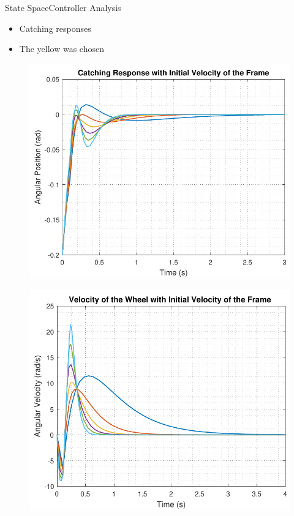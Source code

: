 \begin{frame}{State Space}{Controller Analysis}
  \begin{itemize}
    \item Catching responses
    \item The yellow was chosen
  \end{itemize}
  \vspace{1cm}
  \hspace{0.03\linewidth}
  \begin{minipage}{\linewidth}
  	\begin{minipage}{0.45\linewidth}
  		\begin{figure}[H]
  			\includegraphics[scale=.35]{Pictures/catchingStateSpace}
  			\centering
  		\end{figure}
  	\end{minipage}
  	\hspace{0.03\linewidth}
  	\begin{minipage}{0.45\linewidth}
  		\begin{figure}[H]
  			\includegraphics[scale=.35]{Pictures/catchingStateSpaceWheel}

\end{figure}
\end{minipage}
\end{minipage}
\end{frame}
